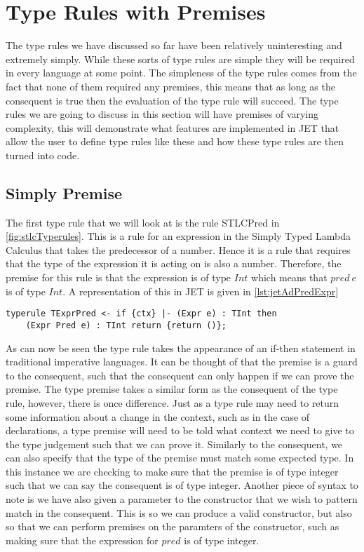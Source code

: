 \section{Type Rules with Premises}
The type rules we have discussed so far have been relatively uninteresting and extremely simply.
While these sorts of type rules are simple they will be required in every language at some point.
The simpleness of the type rules comes from the fact that none of them required any premises, this means that as long as the consequent is true then the evaluation of the type rule will succeed.
The type rules we are going to discuss in this section will have premises of varying complexity, this will demonstrate what features are implemented in JET that allow the user to define type rules like these and how these type rules are then turned into code.

\subsection{Simply Premise}
The first type rule that we will look at is the rule STLCPred in \autoref{fig:stlcTyperules}.
This is a rule for an expression in the Simply Typed Lambda Calculus that takes the predecessor of a number.
Hence it is a rule that requires that the type of the expression it is acting on is also a number.
Therefore, the premise for this rule is that the expression is of type $Int$ which means that $pred\ e$ is of type $Int$.
A representation of this in JET is given in \autoref{lst:jetAdPredExpr}

\begin{lstlisting}[caption = Type rule for pred expression involving one premise, label=lst:jetAdPredExpr]
typerule TExprPred <- if {ctx} |- (Expr e) : TInt then 
    (Expr Pred e) : TInt return {return ()};
\end{lstlisting}

As can now be seen the type rule takes the appearance of an if-then statement in traditional imperative languages.
It can be thought of that the premise is a guard to the consequent, such that the consequent can only happen if we can prove the premise.
The type premise takes a similar form as the consequent of the type rule, however, there is once difference.
Just as a type rule may need to return some information about a change in the context, such as in the case of declarations, a type premise will need to be told what context we need to give to the type judgement such that we can prove it.
Similarly to the consequent, we can also specify that the type of the premise must match some expected type.
In this instance we are checking to make sure that the premise is of type integer such that we can say the consequent is of type integer.
Another piece of syntax to note is we have also given a parameter to the constructor that we wish to pattern match in the consequent.
This is so we can produce a valid constructor, but also so that we can perform premises on the paramters of the constructor, such as making sure that the expression for $pred$ is of type integer.

